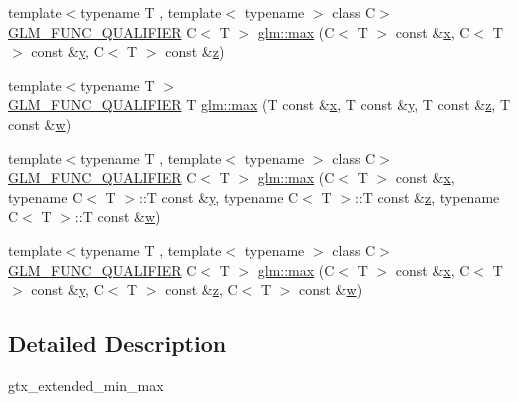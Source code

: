 \begin{DoxyCompactItemize}
\item 
{\footnotesize template$<$typename T , template$<$ typename $>$ class C$>$ }\\\mbox{\hyperlink{setup_8hpp_a33fdea6f91c5f834105f7415e2a64407}{G\+L\+M\+\_\+\+F\+U\+N\+C\+\_\+\+Q\+U\+A\+L\+I\+F\+I\+ER}} C$<$ T $>$ \mbox{\hyperlink{group__gtx__extented__min__max_gaf832e9d4ab4826b2dda2fda25935a3a4}{glm\+::max}} (C$<$ T $>$ const \&\mbox{\hyperlink{glad_8h_a92d0386e5c19fb81ea88c9f99644ab1d}{x}}, C$<$ T $>$ const \&\mbox{\hyperlink{glad_8h_a66ddd433d2cacfe27f5906b7e86faeed}{y}}, C$<$ T $>$ const \&\mbox{\hyperlink{glad_8h_acb78bf1972d3eaf07da34ff2e0a2f133}{z}})
\item 
{\footnotesize template$<$typename T $>$ }\\\mbox{\hyperlink{setup_8hpp_a33fdea6f91c5f834105f7415e2a64407}{G\+L\+M\+\_\+\+F\+U\+N\+C\+\_\+\+Q\+U\+A\+L\+I\+F\+I\+ER}} T \mbox{\hyperlink{group__gtx__extented__min__max_ga78e04a0cef1c4863fcae1a2130500d87}{glm\+::max}} (T const \&\mbox{\hyperlink{glad_8h_a92d0386e5c19fb81ea88c9f99644ab1d}{x}}, T const \&\mbox{\hyperlink{glad_8h_a66ddd433d2cacfe27f5906b7e86faeed}{y}}, T const \&\mbox{\hyperlink{glad_8h_acb78bf1972d3eaf07da34ff2e0a2f133}{z}}, T const \&\mbox{\hyperlink{glad_8h_a1d0296e9e835f2e1ee17634af95fc1ec}{w}})
\item 
{\footnotesize template$<$typename T , template$<$ typename $>$ class C$>$ }\\\mbox{\hyperlink{setup_8hpp_a33fdea6f91c5f834105f7415e2a64407}{G\+L\+M\+\_\+\+F\+U\+N\+C\+\_\+\+Q\+U\+A\+L\+I\+F\+I\+ER}} C$<$ T $>$ \mbox{\hyperlink{group__gtx__extented__min__max_ga7cca8b53cfda402040494cdf40fbdf4a}{glm\+::max}} (C$<$ T $>$ const \&\mbox{\hyperlink{glad_8h_a92d0386e5c19fb81ea88c9f99644ab1d}{x}}, typename C$<$ T $>$\+::T const \&\mbox{\hyperlink{glad_8h_a66ddd433d2cacfe27f5906b7e86faeed}{y}}, typename C$<$ T $>$\+::T const \&\mbox{\hyperlink{glad_8h_acb78bf1972d3eaf07da34ff2e0a2f133}{z}}, typename C$<$ T $>$\+::T const \&\mbox{\hyperlink{glad_8h_a1d0296e9e835f2e1ee17634af95fc1ec}{w}})
\item 
{\footnotesize template$<$typename T , template$<$ typename $>$ class C$>$ }\\\mbox{\hyperlink{setup_8hpp_a33fdea6f91c5f834105f7415e2a64407}{G\+L\+M\+\_\+\+F\+U\+N\+C\+\_\+\+Q\+U\+A\+L\+I\+F\+I\+ER}} C$<$ T $>$ \mbox{\hyperlink{group__gtx__extented__min__max_gaacffbc466c2d08c140b181e7fd8a4858}{glm\+::max}} (C$<$ T $>$ const \&\mbox{\hyperlink{glad_8h_a92d0386e5c19fb81ea88c9f99644ab1d}{x}}, C$<$ T $>$ const \&\mbox{\hyperlink{glad_8h_a66ddd433d2cacfe27f5906b7e86faeed}{y}}, C$<$ T $>$ const \&\mbox{\hyperlink{glad_8h_acb78bf1972d3eaf07da34ff2e0a2f133}{z}}, C$<$ T $>$ const \&\mbox{\hyperlink{glad_8h_a1d0296e9e835f2e1ee17634af95fc1ec}{w}})
\end{DoxyCompactItemize}


\subsection{Detailed Description}
gtx\+\_\+extended\+\_\+min\+\_\+max 